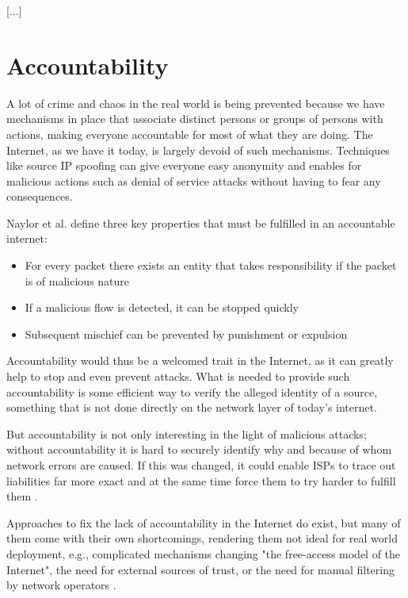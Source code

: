 \documentclass{acm_proc_article-sp}
\begin{document}
[...]


\section{Accountability}
\label{sec:acc}
A lot of crime and chaos in the real world is being prevented because we have mechanisms in place that associate distinct persons or groups of persons with actions, making everyone accountable for most of what they are doing. The Internet, as we have it today, is largely devoid of such mechanisms. Techniques like source IP spoofing can give everyone easy anonymity and enables for malicious actions such as denial of service attacks without having to fear any consequences.

Naylor et al. \cite{apip} define three key properties that must be fulfilled in an accountable internet:
\begin{itemize}
\item For every packet there exists an entity that takes responsibility if the packet is of malicious nature
\item If a malicious flow is detected, it can be stopped quickly
\item Subsequent mischief can be prevented by punishment or expulsion
\end{itemize}

Accountability would thus be a welcomed trait in the Internet, as it can greatly help to stop and even prevent attacks. What is needed to provide such accountability is some efficient way to verify the alleged identity of a source, something that is not done directly on the network layer of today's internet. 

But accountability is not only interesting in the light of malicious attacks; without accountability it is hard to securely identify why and because of whom network errors are caused. If this was changed, it could enable ISPs to trace out liabilities far more exact and at the same time force them to try harder to fulfill them \cite{mot}. 

Approaches to fix the lack of accountability in the Internet do exist, but many of them come with their own shortcomings, rendering them not ideal for real world deployment, e.g., complicated mechanisms changing "the free-access model of the Internet", the need for external sources of trust, or the need for manual filtering by network operators \cite{aip}.
\end{document}
